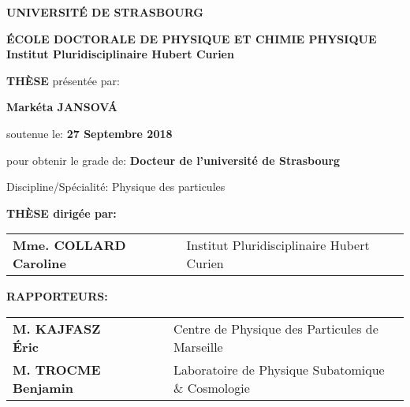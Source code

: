 \begin{titlepage}
    \begin{center}
    \vspace*{-2cm}
        {\Large \textbf{UNIVERSITÉ DE STRASBOURG}}\\

        \vspace*{1cm}

        {\large \textbf{ÉCOLE DOCTORALE DE PHYSIQUE ET CHIMIE PHYSIQUE}}\\
        \textbf{Institut Pluridisciplinaire Hubert Curien}\\

        \vspace*{1cm}

        {\LARGE \textbf{TH\`{E}SE}} présentée par:

        \vspace*{0.3cm}

        {\Large \textbf{Mark\'{e}ta JANSOV\'{A}}}

        soutenue le: \textbf{27 Septembre 2018}
        

        \vspace*{1cm}

        pour obtenir le grade de: \textbf{Docteur de l'université de Strasbourg}


        Discipline/Spécialité: Physique des particules


        \vspace*{1cm}

        \fbox{
        \parbox{\textwidth}{\centering \LARGE \textbf{Recherche du partenaire supersymétrique du quark top et mesure des propriétés des dépôts dans le trajectographe à pistes de silicium de l’expérience CMS au Run 2}} %
         }

        \end{center}

        \vspace*{1cm}

        {\large \textbf{THÈSE dirigée par:}}\\
        \begin{tabular}{ll}
        \hspace{1cm}    \textbf{Mme. COLLARD Caroline}          & Institut Pluridisciplinaire Hubert Curien \\
        \end{tabular}
        
        {\large \textbf{RAPPORTEURS:}} \\
        \begin{tabular}{ll}
            \hspace{1cm}    \textbf{M. KAJFASZ Éric~~~~~~~~}                & Centre de Physique des Particules de Marseille\\
            \hspace{1cm}    \textbf{M. TROCME Benjamin}             & Laboratoire de Physique Subatomique \& Cosmologie \\
        \end{tabular}
        \vspace*{0.5cm}
        \hline


\end{titlepage}
